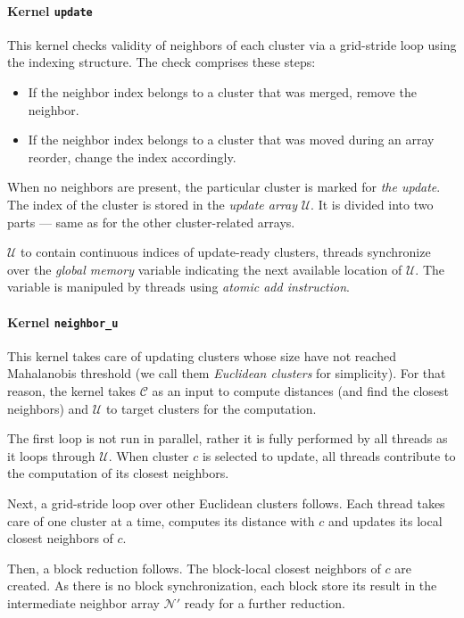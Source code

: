 \paragraph{Kernel \texttt{update}}
This kernel checks validity of neighbors of each cluster via a grid-stride loop using the indexing structure. The check comprises these steps:
\begin{itemize}
	\item If the neighbor index belongs to a cluster that was merged, remove the neighbor.
	\item If the neighbor index belongs to a cluster that was moved during an array reorder, change the index accordingly.
\end{itemize} 
When no neighbors are present, the particular cluster is marked for \emph{the update}. The index of the cluster is stored in the \emph{update array} $\mathcal{U}$. It is divided into two parts --- same as for the other cluster-related arrays. 

$\mathcal{U}$ to contain continuous indices of update-ready clusters, threads synchronize over the \emph{global memory} variable indicating the next available location of $\mathcal{U}$. The variable is manipuled by threads using \emph{atomic add instruction}.

\paragraph{Kernel \texttt{neighbor\_u}}

This kernel takes care of updating clusters whose size have not reached Mahalanobis threshold (we call them \emph{Euclidean clusters} for simplicity). For that reason, the kernel takes $\mathcal{C}$ as an input to compute distances (and find the closest neighbors) and $\mathcal{U}$ to target clusters for the computation.

The first loop is not run in parallel, rather it is fully performed by all threads as it loops through $\mathcal{U}$. When cluster $c$ is selected to update, all threads contribute to the computation of its closest neighbors.

Next, a grid-stride loop over other Euclidean clusters follows. Each thread takes care of one cluster at a time, computes its distance with $c$ and updates its local closest neighbors of $c$.

Then, a block reduction follows. The block-local closest neighbors of $c$ are created. As there is no block synchronization, each block store its result in the intermediate neighbor array $\mathcal{N}'$ ready for a further reduction.

